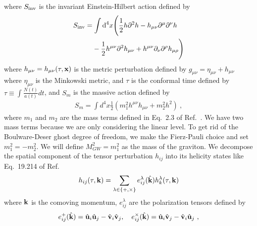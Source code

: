 \documentclass[prd,twocolumn,aps,psfig,nofootinbib,nobibnotes,superscriptaddress,preprintnumbers,times]{revtex4-2}
\newcommand{\inv}{\rm inv}
\begin{document}
\hspace{-1em}where $S_{\inv}$ is the invariant Einstein-Hilbert action defined by 
\begin{equation} \label{eqn:action_inv}
     \begin{multlined}
     S_{\inv} = \int \text{d}^4x\Bigg(\frac{1}{2}h\partial^2h - h_{\mu \nu}\partial^\mu \partial^\nu h \\ - \frac{1}{2}h^{\mu\nu} \partial^2 h_{\mu\nu} + h^{\mu\nu}\partial_\nu \partial^\rho h_{\mu \rho} \Bigg) 
    \end{multlined}
\end{equation} 
where $h_{\mu\nu} = h_{\mu\nu}(\tau,{\bf x})$ is the metric perturbation defined by $g_{\mu\nu} = \eta_{\mu\nu} + h_{\mu\nu}$ where $\eta_{\mu\nu}$ is the Minkowski metric, and $\tau$ is the conformal time defined by $\tau \equiv \int \frac{N(t)}{a(t)}dt$, and $S_m$ is the massive action defined by 
\begin{equation} \label{eqn:action_m}
     \begin{multlined}
     S_m = \int d^4x\frac{1}{2}(m_1^2 h^{\mu\nu}h_{\mu\nu}+ m_2^2 h^2)\ ,
    \end{multlined}
\end{equation}
where $m_1$ and $m_2$ are the mass terms defined in Eq.\ 2.3 of Ref.\ \cite{Blasi:2017}. We have two mass terms because we are only considering the linear level. To get rid of the Boulware-Deser ghost degree of freedom, we make the Fierz-Pauli choice and set $m_1^2 = -m_2^2$. We will define $M_{GW}^2 = m_1^2$ as the mass of the graviton. We decompose the spatial component of the tensor perturbation $h_{ij}$ into its helicity states like Eq.\ 19.214 of Ref.\ \cite{Maggiore:v2} 
\begin{equation}\label{eqn:decomp}
    h_{ij}(\tau, {\bf k}) = \sum_{\lambda \in \{+, \times\}}e^\lambda_{ij}(\hat{\bf k})h_k^\lambda(\tau, {\bf k})
\end{equation}
where ${\bf k}$ is the comoving momentum, $e^\lambda_{ij}$ are the polarization tensors defined by 
\begin{equation}\label{eqn:polarization}
    e^+_{ij}(\hat{\bf k}) = \hat{\bf u}_i\hat{\bf u}_j - \hat{\bf v}_i\hat{\bf v}_j, \quad e^\times_{ij}(\hat{\bf k}) = \hat{\bf u}_i\hat{\bf v}_j - \hat{\bf v}_i\hat{\bf u}_j\ ,
\end{equation}
\end{document}
